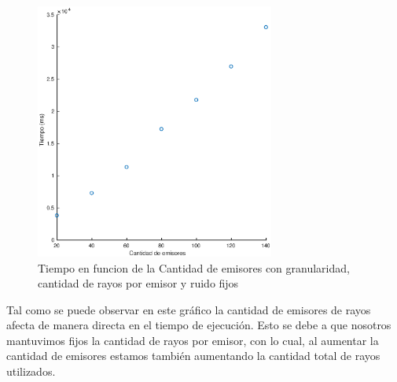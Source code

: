 \begin{figure}[H]
	\centering	\includegraphics[width=0.7\textwidth]{img/emi_tiempo}
	\caption{Tiempo en funcion de la Cantidad de emisores con granularidad, cantidad de rayos por emisor y ruido fijos}
	\label{fig:emi_tiempo}
\end{figure}
\par Tal como se puede observar en este gr\'afico la cantidad de emisores de rayos afecta de manera directa en el tiempo de ejecuci\'on. Esto se debe a que nosotros mantuvimos fijos la cantidad de rayos por emisor, con lo cual, al aumentar
la cantidad de emisores estamos tambi\'en aumentando la cantidad total de rayos utilizados.

